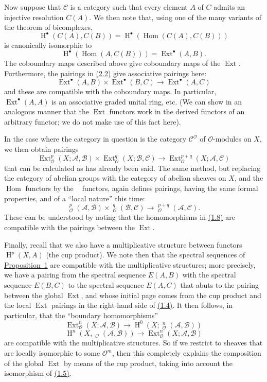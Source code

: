 \documentclass{article}
\theoremstyle{plain}
\theoremstyle{definition}
\newcommand{\scr}[1]{{\mathscr{#1}}}
\renewcommand{\cal}[1]{{\mathcal{#1}}}
\DeclareMathOperator{\Ext}{Ext}
\DeclareMathOperator{\Hom}{Hom}
\DeclareMathOperator{\shExt}{\underline{Ext}}
\DeclareMathOperator{\shHom}{\underline{Hom}}
\DeclareMathOperator{\HH}{H}
\newcommand{\oldpage}[1]{\marginpar{\footnotesize$\Big\vert$ \textit{p.~#1}}}
\begin{document}
Now suppose that $\cal{C}$ is a category such that every element $A$ of $C$ admits an injective resolution $C(A)$.
We then note that, using one of the many variants of the theorem of bicomplexes,
\[
  \HH^\bullet(C(A),C(B)) = \HH^\bullet(\Hom(C(A),C(B)))
\]
is canonically isomorphic to
\[
  \HH^\bullet(\Hom(A,C(B))) = \Ext^\bullet(A,B).
\]
The coboundary maps described above give coboundary maps of the $\Ext$.
Furthermore, the pairings in \hyperref[2.2]{(2.2)} give associative pairings here:
\[
\label{2.3}
  \Ext^\bullet(A,B)\times\Ext^\bullet(B,C) \to \Ext^\bullet(A,C)
\tag{2.3}
\]
and these are compatible with the coboundary maps.
In particular, $\Ext^\bullet(A,A)$ is an associative graded unital ring, etc.
(We can show in an analogous manner that the $\Ext$ functors work in the derived functors of an arbitrary functor;
we do not make use of this fact here).

In the case where the category in question is the category $\cal{C}^\scr{O}$ of $\scr{O}$-modules on $X$, we then obtain pairings
\[
\label{2.4}
  \Ext_\scr{O}^p(X;\scr{A},\scr{B})\times\Ext_\scr{O}^q(X;\scr{B},\scr{C}) \to \Ext_\scr{O}^{p+q}(X;\scr{A},\scr{C})
\tag{2.4}
\]
that can be calculated as has already been said.
The same method, but replacing the category of abelian groups with the category of abelian sheaves on $X$, and the $\Hom$ functors by the $\shHom$ functors, again defines pairings, having the same formal properties, and of a ``local nature'' this time:
\[
\label{2.5}
  \shExt_\scr{O}^p(\scr{A},\scr{B})\times\shExt_\scr{O}^q(\scr{B},\scr{C}) \to \shExt_\scr{O}^{p+q}(\scr{A},\scr{C}).
\tag{2.5}
\]
These can be understood by noting that the homomorphisms in \hyperref[1.8]{(1.8)} are compatible with the pairings between the $\Ext$.

\oldpage{149-05}
Finally, recall that we also have a multiplicative structure between functors $\HH^p(X,A)$ (the cup product).
We note then that the spectral sequences of \hyperref[proposition1]{Proposition~1} are compatible with the multiplicative structures;
more precisely, we have a pairing from the spectral sequence $E(A,B)$ with the spectral sequence $E(B,C)$ to the spectral sequence $E(A,C)$ that abuts to the pairing between the global $\Ext$, and whose initial page comes from the cup product and the local $\Ext$ pairings in the right-hand side of \hyperref[1.4]{(1.4)}.
It then follows, in particular, that the ``boundary homomorphisms''
\[
\label{2.6}
  \Ext_\scr{O}^n(X;\scr{A},\scr{B}) \to \HH^0(X;\shExt_\scr{O}^n(\scr{A},\scr{B}))
\tag{2.6}
\]
\[
\label{2.7}
  \HH^n(X,\shHom_\scr{O}(\scr{A},\scr{B})) \to \Ext_\scr{O}^n(X;\scr{A},\scr{B})
\tag{2.7}
\]
are compatible with the multiplicative structures.
So if we restrict to sheaves that are locally isomorphic to some $\scr{O}^m$, then this completely explains the composition of the global $\Ext$ by means of the cup product, taking into account the isomorphism of \hyperref[1.5]{(1.5)}.
\end{document}
